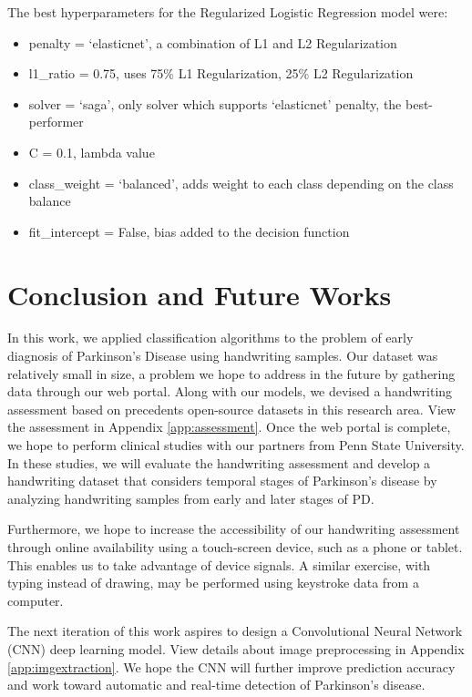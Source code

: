 \documentclass[pmlr,twocolumn,10pt]{jmlr} %
\newcommand\red[1]{{\color{red}#1}}
\begin{document}
The best hyperparameters for the Regularized Logistic Regression model were:
\begin{itemize}
\item penalty = ‘elasticnet’, a combination of L1 and L2 Regularization
\item l1\_ratio = 0.75, uses 75\% L1 Regularization, 25\% L2 Regularization
\item solver = ‘saga’, only solver which supports ‘elasticnet’ penalty, the best-performer
\item C = 0.1, lambda value
\item class\_weight = ‘balanced’, adds weight to each class depending on the class balance
\item fit\_intercept = False, bias added to the decision function
\end{itemize}

\section{Conclusion and Future Works}
\label{Conclusion+FutureWorks} 
In this work, we applied classification algorithms to the problem of early diagnosis of Parkinson's Disease using handwriting samples. Our dataset was relatively small in size, a problem we hope to address in the future by gathering data through our web portal. Along with our models, we devised a handwriting assessment based on precedents open-source datasets in this research area. View the assessment in Appendix \ref{app:assessment}. Once the web portal is complete, we hope to perform clinical studies with our partners from Penn State University. In these studies, we will evaluate the handwriting assessment and develop a handwriting dataset that considers temporal stages of Parkinson’s disease by analyzing handwriting samples from early and later stages of PD. 

Furthermore, we hope to increase the accessibility of our handwriting assessment through online availability using a touch-screen device, such as a phone or tablet. This enables us to take advantage of device signals. A similar exercise, with typing instead of drawing, may be performed using keystroke data from a computer. 

The next iteration of this work aspires to design a Convolutional Neural Network (CNN) deep learning model. View details about image preprocessing in Appendix \ref{app:imgextraction}. We hope the CNN will further improve prediction accuracy and work toward automatic and real-time detection of Parkinson’s disease. %
\end{document}
